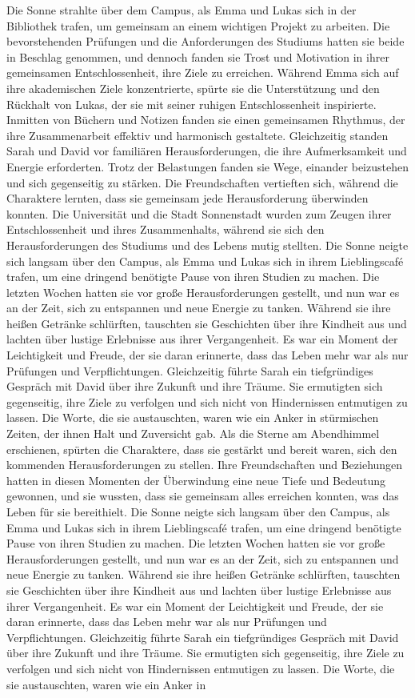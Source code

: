 \documentclass[12pt]{article} %
\begin{document}
 Die Sonne strahlte über dem Campus, als Emma und Lukas sich in der Bibliothek trafen, um gemeinsam an einem wichtigen Projekt zu arbeiten. Die bevorstehenden Prüfungen und die Anforderungen des Studiums hatten sie beide in Beschlag genommen, und dennoch fanden sie Trost und Motivation in ihrer gemeinsamen Entschlossenheit, ihre Ziele zu erreichen. Während Emma sich auf ihre akademischen Ziele konzentrierte, spürte sie die Unterstützung und den Rückhalt von Lukas, der sie mit seiner ruhigen Entschlossenheit inspirierte. Inmitten von Büchern und Notizen fanden sie einen gemeinsamen Rhythmus, der ihre Zusammenarbeit effektiv und harmonisch gestaltete. Gleichzeitig standen Sarah und David vor familiären Herausforderungen, die ihre Aufmerksamkeit und Energie erforderten. Trotz der Belastungen fanden sie Wege, einander beizustehen und sich gegenseitig zu stärken. Die Freundschaften vertieften sich, während die Charaktere lernten, dass sie gemeinsam jede Herausforderung überwinden konnten. Die Universität und die Stadt Sonnenstadt wurden zum Zeugen ihrer Entschlossenheit und ihres Zusammenhalts, während sie sich den Herausforderungen des Studiums und des Lebens mutig stellten. Die Sonne neigte sich langsam über den Campus, als Emma und Lukas sich in ihrem Lieblingscafé trafen, um eine dringend benötigte Pause von ihren Studien zu machen. Die letzten Wochen hatten sie vor große Herausforderungen gestellt, und nun war es an der Zeit, sich zu entspannen und neue Energie zu tanken. Während sie ihre heißen Getränke schlürften, tauschten sie Geschichten über ihre Kindheit aus und lachten über lustige Erlebnisse aus ihrer Vergangenheit. Es war ein Moment der Leichtigkeit und Freude, der sie daran erinnerte, dass das Leben mehr war als nur Prüfungen und Verpflichtungen. Gleichzeitig führte Sarah ein tiefgründiges Gespräch mit David über ihre Zukunft und ihre Träume. Sie ermutigten sich gegenseitig, ihre Ziele zu verfolgen und sich nicht von Hindernissen entmutigen zu lassen. Die Worte, die sie austauschten, waren wie ein Anker in stürmischen Zeiten, der ihnen Halt und Zuversicht gab. Als die Sterne am Abendhimmel erschienen, spürten die Charaktere, dass sie gestärkt und bereit waren, sich den kommenden Herausforderungen zu stellen. Ihre Freundschaften und Beziehungen hatten in diesen Momenten der Überwindung eine neue Tiefe und Bedeutung gewonnen, und sie wussten, dass sie gemeinsam alles erreichen konnten, was das Leben für sie bereithielt. Die Sonne neigte sich langsam über den Campus, als Emma und Lukas sich in ihrem Lieblingscafé trafen, um eine dringend benötigte Pause von ihren Studien zu machen. Die letzten Wochen hatten sie vor große Herausforderungen gestellt, und nun war es an der Zeit, sich zu entspannen und neue Energie zu tanken. Während sie ihre heißen Getränke schlürften, tauschten sie Geschichten über ihre Kindheit aus und lachten über lustige Erlebnisse aus ihrer Vergangenheit. Es war ein Moment der Leichtigkeit und Freude, der sie daran erinnerte, dass das Leben mehr war als nur Prüfungen und Verpflichtungen. Gleichzeitig führte Sarah ein tiefgründiges Gespräch mit David über ihre Zukunft und ihre Träume. Sie ermutigten sich gegenseitig, ihre Ziele zu verfolgen und sich nicht von Hindernissen entmutigen zu lassen. Die Worte, die sie austauschten, waren wie ein Anker in 
\end{document}
